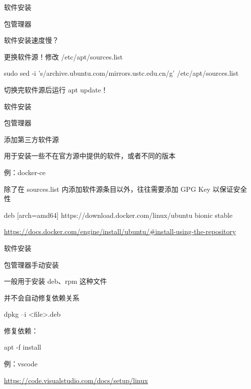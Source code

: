 \documentclass[UTF8]{ctexbeamer}
\begin{document}
\begin{frame}{软件安装}

    包管理器
    
    软件安装速度慢？

    更换软件源！修改 /etc/apt/sources.list

    sudo sed -i 's/archive.ubuntu.com/mirrors.ustc.edu.cn/g' /etc/apt/sources.list

    切换完软件源后运行 apt update！

\end{frame}

\begin{frame}{软件安装}

    包管理器

    添加第三方软件源

    用于安装一些不在官方源中提供的软件，或者不同的版本

    例：docker-ce

    除了在 sources.list 内添加软件源条目以外，往往需要添加 GPG Key 以保证安全性

    deb [arch=amd64] https://download.docker.com/linux/ubuntu bionic stable

    \url{https://docs.docker.com/engine/install/ubuntu/\#install-using-the-repository}

\end{frame}

\begin{frame}{软件安装}


    包管理器手动安装

    一般用于安装 deb、rpm 这种文件

    并不会自动修复依赖关系

    dpkg –i <file>.deb

    修复依赖：

    apt -f install

    例：vscode

    \url{https://code.visualstudio.com/docs/setup/linux}

\end{frame}
\end{document}
